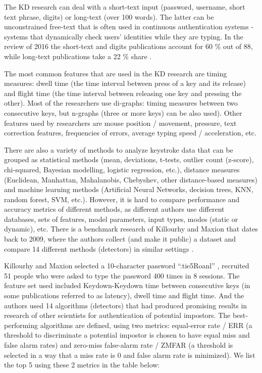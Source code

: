 \documentclass[12pt,a4]{article}
\begin{document}
The KD research can deal with a short-text input (password, username, short text phrase, digits) or long-text (over 100 words). The latter can be unconstrained free-text that is often used in continuous authentication systems - systems that dynamically check users’ identities while they are typing. In the review of 2016 the short-text and digits publications account for 60 \% out of 88, while long-text publications take a 22 \% share \cite{Liakat:2017}.

The most common features that are used in the KD research are timing measures: dwell time (the time interval between press of a key and its release) and flight time (the time interval between releasing one key and pressing the other). Most of the researchers use di-graphs: timing measures between two consecutive keys, but n-graphs (three or more keys) can be also used). Other features used by researchers are mouse position / movement, pressure, text correction features, frequencies of errors, average typing speed / acceleration, etc.

There are also a variety of methods to analyze keystroke data that can be grouped as statistical methods (mean, deviations, t-tests, outlier count (z-score), chi-squared, Bayesian modelling, logistic regression, etc.), distance measures (Euclidean, Manhattan, Mahalanobis, Chebyshev, other distance-based measures) and machine learning methods (Artificial Neural Networks, decision trees, KNN, random forest, SVM, etc.). However, it is hard to compare performance and accuracy metrics of different methods, as different authors use different databases, sets of features, model parameters, input types, modes (static or dynamic), etc. There is a benchmark research of Killourhy and Maxion that dates back to 2009, where the authors collect (and make it public) a dataset and compare 14 different methods (detectors) in similar settings \cite{killourhy2009comparing}.

Killourhy and Maxion selected  a 10-character password “.tie5Roanl” , recruited 51 people who were asked to type the password 400 times in 8 sessions. The feature set used included  Keydown-Keydown time between consecutive keys (in some publications referred to as latency), dwell time and flight time. And the authors used 14 algorithms (detectors) that had produced promising results in research of other scientists for authentication of potential impostors. The best-performing algorithms are defined, using two metrics: equal-error rate / ERR (a threshold to discriminate a potential impostor is chosen to have equal miss and false alarm rates) and zero-miss false-alarm rate / ZMFAR (a threshold is selected in a way that a miss rate is 0 and false alarm rate is minimized). We list the top 5 using these 2 metrics in the table below:
\end{document}

